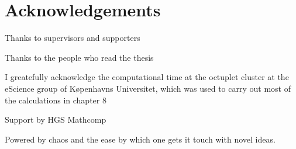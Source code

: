 \chapter*{Acknowledgements}

Thanks to supervisors and supporters

Thanks to the people who read the thesis


I greatefully acknowledge the computational time at the octuplet cluster at
the eScience group of Køpenhavns Universitet, which was used to carry out
most of the calculations in chapter 8

Support by HGS Mathcomp

Powered by chaos and the ease by which one gets it touch with novel ideas.
